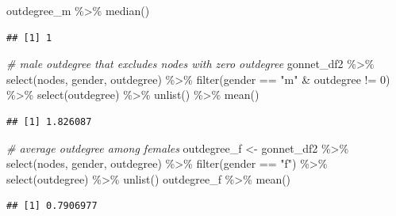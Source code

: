 \documentclass[12pt]{article}
\newenvironment{Shaded}{\begin{snugshade}}{\end{snugshade}}
\newcommand{\CommentTok}[1]{\textcolor[rgb]{0.56,0.35,0.01}{\textit{#1}}}
\newcommand{\DecValTok}[1]{\textcolor[rgb]{0.00,0.00,0.81}{#1}}
\newcommand{\FunctionTok}[1]{\textcolor[rgb]{0.00,0.00,0.00}{#1}}
\newcommand{\NormalTok}[1]{#1}
\newcommand{\OtherTok}[1]{\textcolor[rgb]{0.56,0.35,0.01}{#1}}
\newcommand{\SpecialCharTok}[1]{\textcolor[rgb]{0.00,0.00,0.00}{#1}}
\newcommand{\StringTok}[1]{\textcolor[rgb]{0.31,0.60,0.02}{#1}}
\begin{document}
\begin{Shaded}
\begin{Highlighting}[]
\NormalTok{outdegree\_m }\SpecialCharTok{\%\textgreater{}\%} \FunctionTok{median}\NormalTok{()}
\end{Highlighting}
\end{Shaded}

\begin{verbatim}
## [1] 1
\end{verbatim}

\begin{Shaded}
\begin{Highlighting}[]
\CommentTok{\# male outdegree that excludes nodes with zero outdegree}
\NormalTok{gonnet\_df2 }\SpecialCharTok{\%\textgreater{}\%}
  \FunctionTok{select}\NormalTok{(nodes, gender, outdegree) }\SpecialCharTok{\%\textgreater{}\%}
  \FunctionTok{filter}\NormalTok{(gender }\SpecialCharTok{==} \StringTok{"m"} \SpecialCharTok{\&}\NormalTok{ outdegree }\SpecialCharTok{!=} \DecValTok{0}\NormalTok{) }\SpecialCharTok{\%\textgreater{}\%}
  \FunctionTok{select}\NormalTok{(outdegree) }\SpecialCharTok{\%\textgreater{}\%}
  \FunctionTok{unlist}\NormalTok{() }\SpecialCharTok{\%\textgreater{}\%} \FunctionTok{mean}\NormalTok{()}
\end{Highlighting}
\end{Shaded}

\begin{verbatim}
## [1] 1.826087
\end{verbatim}

\begin{Shaded}
\begin{Highlighting}[]
\CommentTok{\# average outdegree among females}
\NormalTok{outdegree\_f }\OtherTok{\textless{}{-}}\NormalTok{ gonnet\_df2 }\SpecialCharTok{\%\textgreater{}\%} 
  \FunctionTok{select}\NormalTok{(nodes, gender, outdegree) }\SpecialCharTok{\%\textgreater{}\%}
  \FunctionTok{filter}\NormalTok{(gender }\SpecialCharTok{==} \StringTok{"f"}\NormalTok{) }\SpecialCharTok{\%\textgreater{}\%} 
  \FunctionTok{select}\NormalTok{(outdegree) }\SpecialCharTok{\%\textgreater{}\%}
  \FunctionTok{unlist}\NormalTok{()}
\NormalTok{outdegree\_f }\SpecialCharTok{\%\textgreater{}\%} \FunctionTok{mean}\NormalTok{()}
\end{Highlighting}
\end{Shaded}

\begin{verbatim}
## [1] 0.7906977
\end{verbatim}
\end{document}
